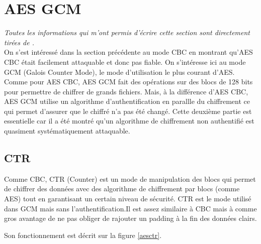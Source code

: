 \documentclass[a4paper, 12pt]{article}
\begin{document}
\section{AES GCM}
\noindent\emph{Toutes les informations qui m'ont permis d'écrire cette section sont directement tirées de \cite{courscourt}.}\\


On s'est intéressé dans la section précédente au mode CBC en montrant qu'AES CBC était facilement attaquable et donc pas fiable. On s'intéresse ici au mode GCM (Galois Counter Mode), le mode d'utilisation le plus courant d'AES. Comme pour AES CBC, AES GCM fait des opérations sur des blocs de 128 bits pour permettre de chiffrer de grands fichiers. Mais, à la différence d'AES CBC, AES GCM utilise un algorithme d'authentification en parallle du chiffrement ce qui permet d'assurer que le chiffré n'a pas été changé. Cette deuxième partie est essentielle car il a été montré qu'un algorithme de chiffrement non authentifié est quasiment systématiquement attaquable.

\subsection{CTR} \label{CTR}
Comme CBC, CTR (Counter) est un mode de manipulation des blocs qui permet de chiffrer des données avec des algorithme de chiffrement par blocs (comme AES) tout en garantisant un certain niveau de sécurité. CTR est le mode utilisé dans GCM mais sans l'authentification.Il est assez similaire à CBC mais à comme gros avantage de ne pas obliger de rajouter un padding à la fin des données clairs.

Son fonctionnement est décrit sur la figure \ref{aesctr}. 
\end{document}
